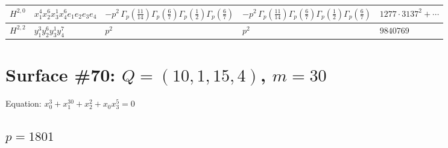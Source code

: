 \documentclass[11pt]{article}
\begin{document}
\begin{table}[ht]
{\begin{tabular}{@{}lllll@{}}
\midrule
$H^{2,0}$ & $x_{1}^{4} x_{2}^{6} x_{3}^{1} x_{4}^{6}  e_{1} e_{2} e_{3} e_{4}$ & $- p^{2} \, \Gamma_p \left( \frac{11}{14} \right) \Gamma_p \left( \frac{6}{7} \right) \Gamma_p \left( \frac{1}{2} \right) \Gamma_p \left( \frac{6}{7} \right)$ & $- p^{2} \, \Gamma_p \left( \frac{11}{14} \right) \Gamma_p \left( \frac{6}{7} \right) \Gamma_p \left( \frac{1}{2} \right) \Gamma_p \left( \frac{6}{7} \right)$ & $1277{\cdot}3137^{2}{+}\cdots$ \\
\midrule
$H^{2,2}$ & $y_{1}^{3} y_{2}^{6} y_{3}^{1} y_{4}^{7}$ & $p^{2} \,$ & $p^{2} \,$ & $9840769$ \\
\bottomrule
\end{tabular}
}
\renewcommand{\arraystretch}{1.0}
\end{table}

\newpage

\section*{Surface \#70: $Q=(10, 1, 15, 4)$, $m=30$}

Equation: $x_0^{3} + x_1^{30} + x_2^{2} + x_0 x_3^{5} = 0$

\subsection*{$p = 1801$}
\end{document}
